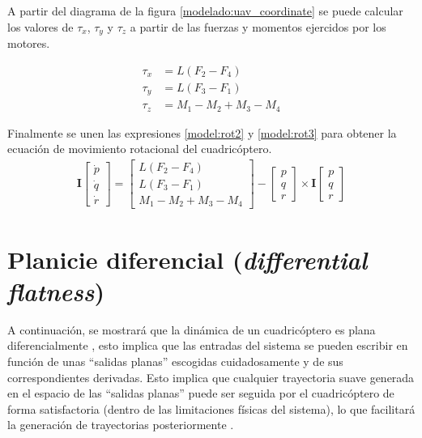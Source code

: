 A partir del diagrama de la figura \ref{modelado:uav_coordinate} se puede calcular los valores de $\tau_x$, $\tau_y$ y $\tau_z$ a partir de las fuerzas y momentos ejercidos por los motores.

\begin{align}
	\tau_x &=  L (F_2-F_4)\nonumber\\
	\tau_y &=  L (F_3-F_1)\nonumber\\
	\tau_z &=  M_1 - M_2 + M_3 - M_4\label{model:rot3}
\end{align}

Finalmente se unen las expresiones \ref{model:rot2} y \ref{model:rot3} para obtener la ecuación de movimiento rotacional del cuadricóptero.
\begin{align}
	\label{model:rot_eq}
	\mathbf{I}\begin{bmatrix}
		\dot{p}\\
		\dot{q}\\
		\dot{r}
	\end{bmatrix}=\left[
	\begin{array}{c}
		L (F_2-F_4)\\
		L (F_3-F_1)\\
		M_1 - M_2 + M_3 - M_4
	\end{array}\right] -\begin{bmatrix}
		p\\
		q\\
		r
	\end{bmatrix} \times\mathbf{I}\begin{bmatrix}
		p\\
		q\\
		r
	\end{bmatrix}
\end{align}

\section{Planicie diferencial (\textit{differential flatness})}\label{diffFlat}

A continuación, se mostrará que la dinámica de un cuadricóptero es plana diferencialmente \cite{mellinger2012trajectory}\cite{ferrin2011differential}\cite{MinimunSnap2011}, esto implica que las entradas del sistema se pueden escribir en función de unas ``salidas planas'' escogidas cuidadosamente y de sus correspondientes derivadas. Esto implica que cualquier trayectoria suave generada en el espacio de las ``salidas planas'' puede ser seguida por el cuadricóptero de forma satisfactoria (dentro de las limitaciones físicas del sistema), lo que facilitará la generación de trayectorias posteriormente . 

